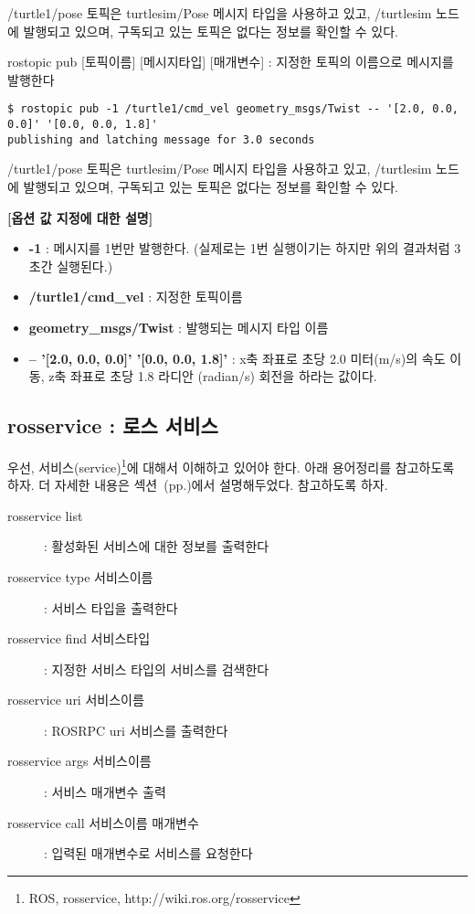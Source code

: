 \noindent
/turtle1/pose 토픽은 turtlesim/Pose 메시지 타입을 사용하고 있고, /turtlesim 노드에 발행되고 있으며, 구독되고 있는 토픽은 없다는 정보를 확인할 수 있다. 

\vspace{\baselineskip}
\noindent
{}\circled{\thenum} rostopic pub [토픽이름] [메시지타입] [매개변수] : 지정한 토픽의 이름으로 메시지를 발행한다

\begin{lstlisting}[language=ROS]
$ rostopic pub -1 /turtle1/cmd_vel geometry_msgs/Twist -- '[2.0, 0.0, 0.0]' '[0.0, 0.0, 1.8]'
publishing and latching message for 3.0 seconds
\end{lstlisting}

\noindent
/turtle1/pose 토픽은 turtlesim/Pose 메시지 타입을 사용하고 있고, /turtlesim 노드에 발행되고 있으며, 구독되고 있는 토픽은 없다는 정보를 확인할 수 있다. 

\vspace{\baselineskip}
\noindent
\textbf{[옵션 값 지정에 대한 설명]}
\begin{itemize}[leftmargin=*]
\item \textbf{-1} : 메시지를 1번만 발행한다. (실제로는 1번 실행이기는 하지만 위의 결과처럼 3초간 실행된다.)
\item \textbf{/turtle1/cmd\_vel} : 지정한 토픽이름
\item \textbf{geometry\_msgs/Twist} : 발행되는 메시지 타입 이름
\item \textbf{-- '[2.0, 0.0, 0.0]' '[0.0, 0.0, 1.8]'} : x축 좌표로 초당 2.0 미터(m/s)의 속도 이동, z축 좌표로 초당 1.8 라디안 (radian/s) 회전을 하라는 값이다.
\end{itemize}

\subsection{rosservice : 로스 서비스}

우선, 서비스(service)\footnote{ROS, rosservice, http://wiki.ros.org/rosservice}에 대해서 이해하고 있어야 한다. 아래 용어정리를 참고하도록 하자. 더 자세한 내용은 섹션~(pp.\pageref{def:RosService})에서 설명해두었다. 참고하도록 하자.

\vspace{\baselineskip}
\noindent
\begin{description}
\item[rosservice list] : 활성화된 서비스에 대한 정보를 출력한다
\item[rosservice type 서비스이름] : 서비스 타입을 출력한다
\item[rosservice find 서비스타입] : 지정한 서비스 타입의 서비스를 검색한다
\item[rosservice uri  서비스이름] : ROSRPC uri 서비스를 출력한다
\item[rosservice args 서비스이름] : 서비스 매개변수 출력
\item[rosservice call 서비스이름 매개변수] : 입력된 매개변수로 서비스를 요청한다
\end{description}

